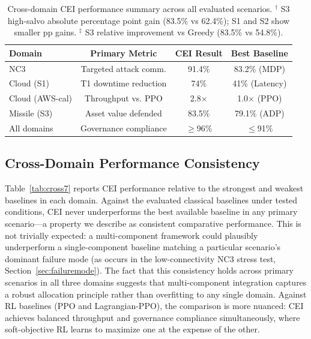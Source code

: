 \documentclass[runningheads]{llncs}
\begin{document}
\begin{table}[ht]
\caption{Cross-domain CEI performance summary across all evaluated scenarios. $^\dagger$ S3 high-salvo absolute percentage point gain (83.5\% vs 62.4\%); S1 and S2 show smaller pp gains. $^\ddagger$ S3 relative improvement vs Greedy (83.5\% vs 54.8\%).}
\label{tab:cross}
\centering
\small
\begin{tabular}{lccc}
\toprule
Domain & Primary Metric & CEI Result & Best Baseline \\
\midrule
NC3            & Targeted attack comm.  & 91.4\%       & 83.2\% (MDP) \\
Cloud (S1)     & T1 downtime reduction  & 74\%         & 41\% (Latency) \\
Cloud (AWS-cal)& Throughput vs. PPO     & 2.8$\times$  & 1.0$\times$ (PPO) \\
Missile (S3)   & Asset value defended   & 83.5\%       & 79.1\% (ADP) \\
\midrule
All domains    & Governance compliance  & $\geq$96\%   & $\leq$91\% \\
\bottomrule
\end{tabular}
\end{table}

\subsection{Cross-Domain Performance Consistency}

Table~\ref{tab:cross7} reports CEI performance relative to the strongest and weakest baselines in each domain. Against the evaluated classical baselines under tested conditions, CEI never underperforms the best available baseline in any primary scenario---a property we describe as consistent comparative performance. This is not trivially expected: a multi-component framework could plausibly underperform a single-component baseline matching a particular scenario's dominant failure mode (as occurs in the low-connectivity NC3 stress test, Section~\ref{sec:failuremode}). The fact that this consistency holds across primary scenarios in all three domains suggests that multi-component integration captures a robust allocation principle rather than overfitting to any single domain. Against RL baselines (PPO and Lagrangian-PPO), the comparison is more nuanced: CEI achieves balanced throughput and governance compliance simultaneously, where soft-objective RL learns to maximize one at the expense of the other.
\end{document}
